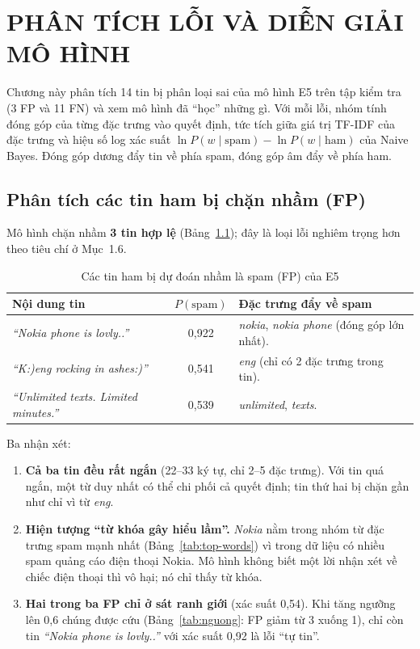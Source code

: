 \chapter{PHÂN TÍCH LỖI VÀ DIỄN GIẢI MÔ HÌNH}

Chương này phân tích 14 tin bị phân loại sai của mô hình E5 trên tập kiểm tra (3 FP và 11 FN) và xem mô hình đã ``học'' những gì. Với mỗi lỗi, nhóm tính đóng góp của từng đặc trưng vào quyết định, tức tích giữa giá trị TF-IDF của đặc trưng và hiệu số log xác suất $\ln P(w\mid\text{spam})-\ln P(w\mid\text{ham})$ của Naive Bayes. Đóng góp dương đẩy tin về phía spam, đóng góp âm đẩy về phía ham.

\section{Phân tích các tin ham bị chặn nhầm (FP)}

Mô hình chặn nhầm \textbf{3 tin hợp lệ} (Bảng~\ref{tab:fp}); đây là loại lỗi nghiêm trọng hơn theo tiêu chí ở Mục~1.6.

\begin{table}[H]
\centering
\caption{Các tin ham bị dự đoán nhầm là spam (FP) của E5}
\label{tab:fp}
\begin{tabular}{|p{4.8cm}|c|p{6.6cm}|}
\hline
\textbf{Nội dung tin} & \textbf{$P(\text{spam})$} & \textbf{Đặc trưng đẩy về spam} \\
\hline
\textit{``Nokia phone is lovly..''} & 0,922 & \textit{nokia}, \textit{nokia phone} (đóng góp lớn nhất). \\
\hline
\textit{``K:)eng rocking in ashes:)''} & 0,541 & \textit{eng} (chỉ có 2 đặc trưng trong tin). \\
\hline
\textit{``Unlimited texts. Limited minutes.''} & 0,539 & \textit{unlimited}, \textit{texts}. \\
\hline
\end{tabular}
\end{table}

Ba nhận xét:

\begin{enumerate}[label=(\arabic*)]
    \item \textbf{Cả ba tin đều rất ngắn} (22--33 ký tự, chỉ 2--5 đặc trưng). Với tin quá ngắn, một từ duy nhất có thể chi phối cả quyết định; tin thứ hai bị chặn gần như chỉ vì từ \textit{eng}.
    \item \textbf{Hiện tượng ``từ khóa gây hiểu lầm''.} \textit{Nokia} nằm trong nhóm từ đặc trưng spam mạnh nhất (Bảng~\ref{tab:top-words}) vì trong dữ liệu có nhiều spam quảng cáo điện thoại Nokia. Mô hình không biết một lời nhận xét về chiếc điện thoại thì vô hại; nó chỉ thấy từ khóa.
    \item \textbf{Hai trong ba FP chỉ ở sát ranh giới} (xác suất 0,54). Khi tăng ngưỡng lên 0,6 chúng được cứu (Bảng~\ref{tab:nguong}: FP giảm từ 3 xuống 1), chỉ còn tin \textit{``Nokia phone is lovly..''} với xác suất 0,92 là lỗi ``tự tin''.
\end{enumerate}


